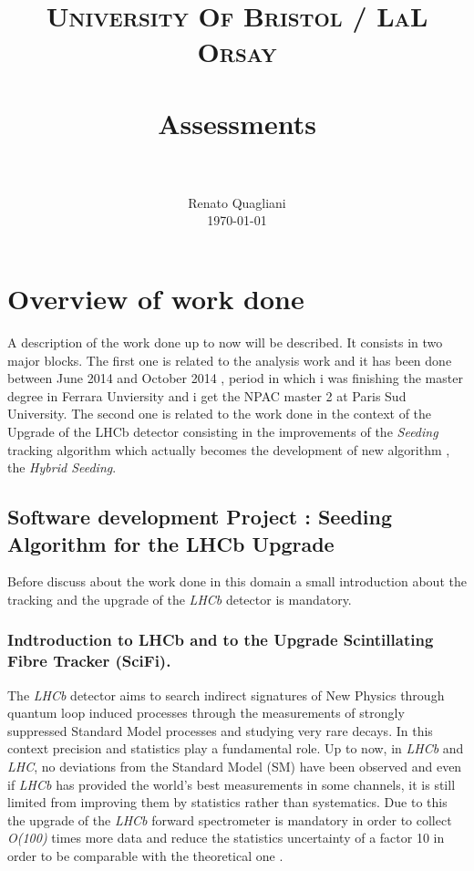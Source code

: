 \documentclass[paper=a4, fontsize=10pt]{scrartcl}
\title{
		\usefont{OT1}{bch}{b}{n}
		\normalfont \normalsize \textsc{University Of Bristol / LaL Orsay} \\ [25pt]
		\horrule{0.5pt} \\[0.4cm]
		\huge Assessments \\
		\horrule{2pt} \\[0.5cm]
}
\author{
		\normalfont 								\normalsize
        Renato Quagliani\\[-3pt]		\normalsize
        \today
}
\date{}
\numberwithin{equation}{section}		%
\numberwithin{figure}{section}			%
\numberwithin{table}{section}				%
\begin{document}
\maketitle
\section{Overview of work done}
A description of the work done up to now will be described. It consists in two major blocks. The first one is related to the analysis work and it has been done between June 2014 and October 2014 , period in which i was finishing the master degree in Ferrara Unviersity and i get the NPAC master 2 at Paris Sud University. The second one is related to the work done in the context of the Upgrade of the LHCb detector consisting in the improvements of the \textit{Seeding} tracking algorithm which actually becomes the development of new algorithm , the \textit{Hybrid Seeding}.
\subsection{Software development Project : Seeding Algorithm for the LHCb Upgrade}
Before discuss about the work done in this domain a small introduction about the tracking and the upgrade of the \textit{LHCb} detector is mandatory.
\subsubsection{Indtroduction to LHCb and to the Upgrade Scintillating Fibre Tracker (SciFi).}
The \textit{LHCb} detector \cite{Blake1} aims to search indirect signatures of New Physics through quantum loop induced processes through the measurements of strongly suppressed Standard Model processes and studying very rare decays. In this context precision and statistics play a fundamental role. Up to now, in \textit{LHCb} and \textit{LHC}, no deviations from the Standard Model (SM) have been observed and even if \textit{LHCb} has provided the world's best measurements in some channels, it is still limited from improving them by statistics rather than systematics. Due to this the upgrade of the \textit{LHCb} forward spectrometer is mandatory in order to collect \textit{O(100)} times more data and reduce the statistics uncertainty of a factor 10 in order to be comparable with the theoretical one \cite{Blake2}\cite{Blake3}.
\end{document}

